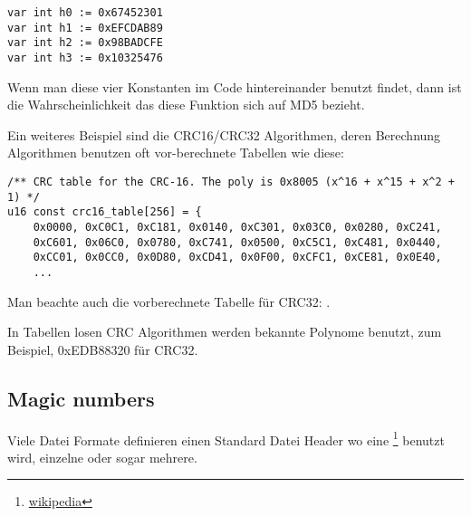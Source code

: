 \begin{verbatim}
var int h0 := 0x67452301
var int h1 := 0xEFCDAB89
var int h2 := 0x98BADCFE
var int h3 := 0x10325476
\end{verbatim}

Wenn man diese vier Konstanten im Code hintereinander benutzt findet, dann ist die Wahrscheinlichkeit das diese Funktion 
sich auf MD5 bezieht.

\par Ein weiteres Beispiel sind die CRC16/CRC32 Algorithmen,
deren Berechnung Algorithmen benutzen oft vor-berechnete Tabellen wie diese:

\begin{lstlisting}[caption=linux/lib/crc16.c,style=customc]
/** CRC table for the CRC-16. The poly is 0x8005 (x^16 + x^15 + x^2 + 1) */
u16 const crc16_table[256] = {
	0x0000, 0xC0C1, 0xC181, 0x0140, 0xC301, 0x03C0, 0x0280, 0xC241,
	0xC601, 0x06C0, 0x0780, 0xC741, 0x0500, 0xC5C1, 0xC481, 0x0440,
	0xCC01, 0x0CC0, 0x0D80, 0xCD41, 0x0F00, 0xCFC1, 0xCE81, 0x0E40,
	...
\end{lstlisting}

Man beachte auch die vorberechnete Tabelle für CRC32: .

In Tabellen losen CRC Algorithmen werden bekannte Polynome benutzt, zum Beispiel, 0xEDB88320 für CRC32.

\subsection{Magic numbers}
\label{magic_numbers}

\newcommand{\FNURLMAGIC}{\footnote{\href{http://go.yurichev.com/17112}{wikipedia}}}

Viele Datei Formate definieren einen Standard Datei Header wo eine \FNURLMAGIC{} benutzt wird, einzelne oder
sogar mehrere. 


